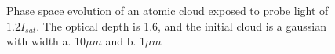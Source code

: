 \documentclass[12pt]{iopart}
\begin{document}
\begin{figure}
\caption{Phase space evolution of an atomic cloud exposed to probe light of $1.2 I_{sat}$. The optical depth is 1.6, and the initial cloud is a gaussian with width a. 10$\mu m$ and b. 1$\mu m$}  
\label{fig:phaseSpace}
\end{figure}
\end{document}
